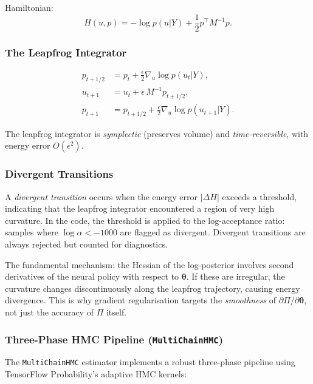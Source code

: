 \documentclass[11pt,a4paper]{article}
\theoremstyle{definition}
\newcommand{\btheta}{\boldsymbol{\theta}}
\newcommand{\code}[1]{\texttt{\color{codecolor}#1}}
\begin{document}
	Hamiltonian:
	\begin{equation}\label{eq:hamiltonian}
		H(u, p) = -\log p(u|Y) + \frac{1}{2} p^\top M^{-1} p.
	\end{equation}
	
	\subsubsection{The Leapfrog Integrator}
	\label{sec:leapfrog}
	
	\begin{align}
		p_{t+1/2} &= p_t + \frac{\epsilon}{2}\nabla_u \log p(u_t | Y), \label{eq:lf1}\\
		u_{t+1} &= u_t + \epsilon \, M^{-1} p_{t+1/2}, \label{eq:lf2}\\
		p_{t+1} &= p_{t+1/2} + \frac{\epsilon}{2}\nabla_u \log p(u_{t+1} | Y). \label{eq:lf3}
	\end{align}
	
	The leapfrog integrator is \emph{symplectic} (preserves volume) and \emph{time-reversible}, with energy error $O(\epsilon^2)$.
	
	\subsubsection{Divergent Transitions}
	\label{sec:divergences}
	
	A \emph{divergent transition} occurs when the energy error $|\Delta H|$ exceeds a threshold, indicating that the leapfrog integrator encountered a region of very high curvature.
	In the code, the threshold is applied to the log-acceptance ratio: samples where $\log \alpha < -1000$ are flagged as divergent.
	Divergent transitions are always rejected but counted for diagnostics.
	
	The fundamental mechanism: the Hessian of the log-posterior involves second derivatives of the neural policy with respect to $\btheta$.
	If these are irregular, the curvature changes discontinuously along the leapfrog trajectory, causing energy divergence.
	This is why gradient regularisation targets the \emph{smoothness} of $\partial\Pi/\partial\btheta$, not just the accuracy of $\Pi$ itself.
	
	\subsubsection{Three-Phase HMC Pipeline (\code{MultiChainHMC})}
	\label{sec:three_phase}
	
	The \code{MultiChainHMC} estimator implements a robust three-phase pipeline using TensorFlow Probability's adaptive HMC kernels:
	
\end{document}
